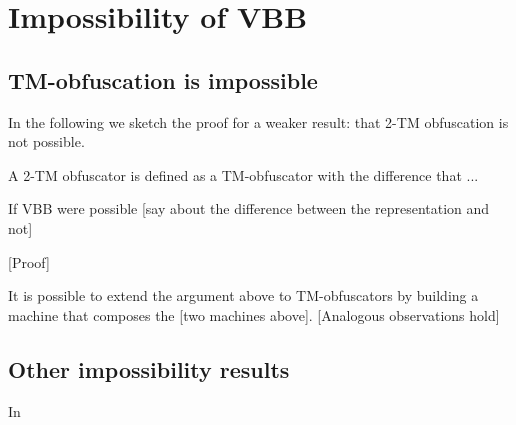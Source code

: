 \section{Impossibility of VBB}

\subsection{TM-obfuscation is impossible}
In the following we sketch the proof for a weaker result: that 2-TM obfuscation is not possible.

A 2-TM obfuscator is defined as a TM-obfuscator with the difference that ...

If VBB were possible [say about the difference between the representation and not]

[Proof]

It is possible to extend the argument above to TM-obfuscators by building a machine that composes the [two machines above]. [Analogous observations hold]

\subsection{Other impossibility results}

In \cite{VBB-imp} 